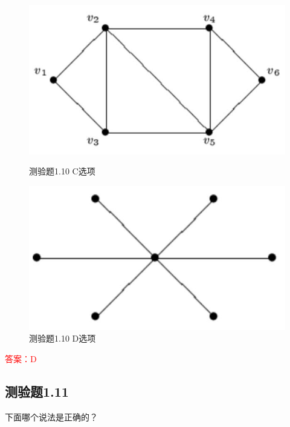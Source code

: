 \documentclass[UTF8, heading=true]{ctexart}
\begin{document}
\begin{figure}[H]
\centering
\begin{minipage}[t]{0.35\textwidth}
    \centering
    \includegraphics[width=1\textwidth]{1.10_3.jpg} %
    \caption{测验题1.10 C选项}
\end{minipage}
  \hspace{0.1\textwidth} %
\begin{minipage}[t]{0.35\textwidth}
    \centering
    \includegraphics[width=1\textwidth]{1.10_4.jpg} %
    \caption{测验题1.10 D选项}
\end{minipage}
\end{figure}

\textcolor{red}{答案：D}



\subsection{测验题1.11}

下面哪个说法是正确的？
\end{document}
